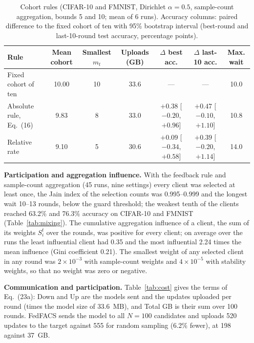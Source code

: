 \documentclass[pdflatex,sn-mathphys-num,oneside]{sn-jnl}%
\theoremstyle{thmstyleone}%
\theoremstyle{thmstyletwo}%
\theoremstyle{thmstylethree}%
\newlength{\journalfloatwidth}
\begin{document}
\begin{table}[!htbp]
\centering
\footnotesize
\setlength{\tabcolsep}{3pt}
\renewcommand{\arraystretch}{1.08}
\caption{Cohort rules (CIFAR-10 and FMNIST, Dirichlet $\alpha=0.5$, sample-count aggregation, bounds 5 and 10; mean of 6 runs). Accuracy columns: paired difference to the fixed cohort of ten with 95\% bootstrap interval (best-round and last-10-round test accuracy, percentage points).}
\label{tab:cohort}
\begin{tabular*}{\journalfloatwidth}{@{\extracolsep{\fill}}lcccccc@{}}
\toprule
Rule & Mean cohort & Smallest $m_t$ & Uploads (GB) & $\Delta$ best acc. & $\Delta$ last-10 acc. & Max. wait \\
\midrule
Fixed cohort of ten & 10.00 & 10 & 33.6 & --- & --- & 10.0 \\
Absolute rule, Eq.~(16) & 9.83 & 8 & 33.0 & $+0.38$ [$-0.20$, $+0.96$] & $+0.47$ [$-0.10$, $+1.10$] & 10.8 \\
Relative rate & 9.10 & 5 & 30.6 & $+0.09$ [$-0.34$, $+0.58$] & $+0.39$ [$-0.20$, $+1.14$] & 14.0 \\
\bottomrule
\end{tabular*}
\end{table}

\textbf{Participation and aggregation influence.} With the feedback rule and sample-count aggregation (45 runs, nine settings) every client was selected at least once, the Jain index of the selection counts was 0.995--0.999 and the longest wait 10--13 rounds, below the guard threshold; the weakest tenth of the clients reached 63.2\% and 76.3\% accuracy on CIFAR-10 and FMNIST (Table~\ref{tab:mixing}). The cumulative aggregation influence of a client, the sum of its weights $S_i^t$ over the rounds, was positive for every client; on average over the runs the least influential client had 0.35 and the most influential 2.24 times the mean influence (Gini coefficient 0.21). The smallest weight of any selected client in any round was $2\times10^{-3}$ with sample-count weights and $4\times10^{-5}$ with stability weights, so that no weight was zero or negative.

\textbf{Communication and participation.} Table~\ref{tab:cost} gives the terms of Eq.~(23a): Down and Up are the models sent and the updates uploaded per round (times the model size of 33.6~MB), and Total GB is their sum over 100 rounds. FedFACS sends the model to all $N=100$ candidates and uploads 520 updates to the target against 555 for random sampling (6.2\% fewer), at 198 against 37~GB.
\end{document}

